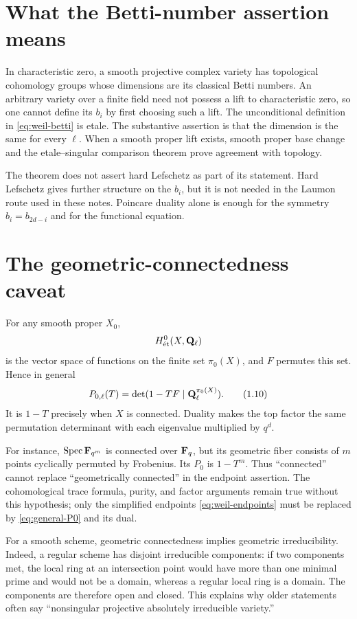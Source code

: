 \section{What the Betti-number assertion means}

In characteristic zero, a smooth projective complex variety has
topological cohomology groups whose dimensions are its classical Betti
numbers.  An arbitrary variety over a finite field need not possess a
lift to characteristic zero, so one cannot define its \(b_i\) by first
choosing such a lift.  The unconditional definition in
\eqref{eq:weil-betti} is etale.  The substantive assertion is that the
dimension is the same for every \(\ell\).  When a smooth proper lift
exists, smooth proper base change and the etale--singular comparison
theorem prove agreement with topology.

The theorem does not assert hard Lefschetz as part of its statement.
Hard Lefschetz gives further structure on the \(b_i\), but it is not
needed in the Laumon route used in these notes.  Poincare duality alone
is enough for the symmetry \(b_i=b_{2d-i}\) and for the functional
equation.

\section{The geometric-connectedness caveat}

For any smooth proper \(X_0\),
\[
 H^0_{\mathrm{\acute et}}(X,\mathbf Q_\ell)
\]
is the vector space of functions on the finite set \(\pi_0(X)\), and
\(F\) permutes this set.  Hence in general
\[
 P_{0,\ell}(T)=\det(1-TF\mid\mathbf Q_\ell^{\pi_0(X)}).
 \tag{1.10}\label{eq:general-P0}
\]
It is \(1-T\) precisely when \(X\) is connected.  Duality makes the top
factor the same permutation determinant with each eigenvalue multiplied
by \(q^d\).

For instance, \(\operatorname{Spec}\mathbf F_{q^m}\) is connected over \(\mathbf F_q\), but
its geometric fiber consists of \(m\) points cyclically permuted by
Frobenius.  Its \(P_0\) is \(1-T^m\).  Thus ``connected'' cannot replace
``geometrically connected'' in the endpoint assertion.  The
cohomological trace formula, purity, and factor arguments remain true
without this hypothesis; only the simplified endpoints
\eqref{eq:weil-endpoints} must be replaced by
\eqref{eq:general-P0} and its dual.

For a smooth scheme, geometric connectedness implies geometric
irreducibility.  Indeed, a regular scheme has disjoint irreducible
components: if two components met, the local ring at an intersection
point would have more than one minimal prime and would not be a domain,
whereas a regular local ring is a domain.  The components are therefore
open and closed.  This explains why older statements often say
``nonsingular projective absolutely irreducible variety.''

